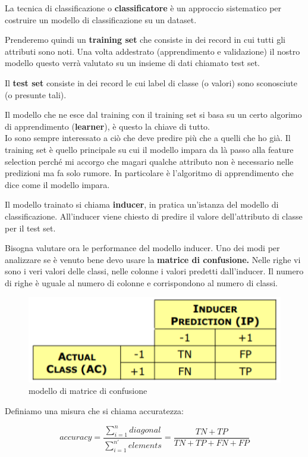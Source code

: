 La tecnica di classificazione o \textbf{classificatore} è un approccio sistematico per costruire un modello di classificazione su un dataset.

Prenderemo quindi un \textbf{training set} che consiste in dei record in cui tutti gli attributi sono noti.  Una volta addestrato (apprendimento e validazione) il nostro modello questo verrà valutato su un insieme di dati chiamato test set.

Il \textbf{test set} consiste in dei record le cui label di classe (o valori) sono sconosciute (o presunte tali).

Il modello che ne esce dal training con il training set si basa su un certo algorimo di apprendimento (\textbf{learner}), \`e questo la chiave di tutto.
\\
Io sono sempre interessato a ciò che deve predire più che a quelli che ho già.
Il training set è  quello principale su cui il modello impara da là passo alla feature selection perché mi accorgo che magari qualche attributo non è necessario nelle predizioni ma fa solo rumore. In particolare è l'algoritmo di apprendimento che dice come il modello impara. 

Il modello trainato si chiama \textbf{inducer}, in pratica un'istanza del modello di classificazione. All'inducer viene chiesto di predire il valore dell'attributo di classe per il test set.

Bisogna valutare ora le performance del modello inducer. Uno dei modi per analizzare se è venuto bene devo usare la \textbf{matrice di confusione.} Nelle righe vi sono i veri valori delle classi, nelle colonne i valori predetti dall'inducer. Il numero di righe è uguale al numero di colonne e corrispondono al numero di classi.

\begin{figure}[h!]
	\centering
	\includegraphics[height=0.2 \linewidth]{pict/matrconf.png}
	\caption{modello di matrice di confusione}
\end{figure}

Definiamo una misura che si chiama accuratezza:

\[accuracy = \frac{\sum_{i = 1}^{n} diagonal}{\sum_{i=1}^{n'}elements} = \frac{TN + TP}{TN + TP + FN + FP}\] 

